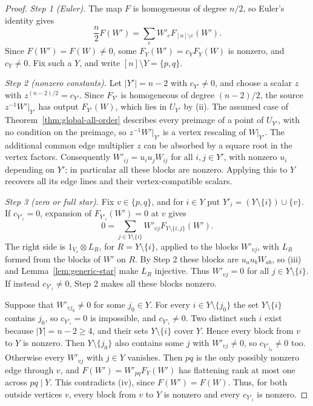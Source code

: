 \documentclass[11pt]{article}
\theoremstyle{remark}\newtheorem{remark}[theorem]{Remark}
\begin{document}
\begin{proof}
\emph{Step 1 (Euler).} The map $F$ is homogeneous of degree $n/2$, so
Euler's identity gives
\[
 \frac n2F(W')=\sum_e W'_eF_{[n]\setminus e}(W').
\]
Since $F(W')=F(W)\ne0$, some $F_Y(W')=c_YF_Y(W)$ is nonzero, and
$c_Y\ne0$. Fix such a $Y$, and write $[n]\setminus Y=\{p,q\}$.

\emph{Step 2 (nonzero constants).} Let $|Y'|=n-2$ with $c_{Y'}\ne0$,
and choose a scalar $z$ with $z^{(n-2)/2}=c_{Y'}$. Since $F_{Y'}$ is
homogeneous of degree $(n-2)/2$, the source $z^{-1}W'|_{Y'}$ has
output $F_{Y'}(W)$, which lies in $U_{Y'}$ by (ii). The assumed case of
Theorem~\ref{thm:global-all-order} describes every preimage of a point
of $U_{Y'}$, with no condition on the preimage, so $z^{-1}W'|_{Y'}$ is
a vertex rescaling of $W|_{Y'}$. The additional common edge multiplier
$z$ can be absorbed by a square root in the vertex factors.
Consequently $W'_{ij}=u_iu_jW_{ij}$ for all $i,j\in Y'$, with nonzero
$u_i$ depending on $Y'$; in particular all these blocks are nonzero.
Applying this to $Y$ recovers all its edge lines and their
vertex-compatible scalars.

\emph{Step 3 (zero or full star).} Fix $v\in\{p,q\}$, and for $i\in Y$
put $Y'_i=(Y\setminus\{i\})\cup\{v\}$. If $c_{Y'_i}=0$, expansion of
$F_{Y'_i}(W')=0$ at $v$ gives
\[
 0=\sum_{j\in Y\setminus\{i\}}
 W'_{vj}F_{Y\setminus\{i,j\}}(W').
\]
The right side is $1_{V_v}\otimes L_R$, for $R=Y\setminus\{i\}$,
applied to the blocks $W'_{vj}$, with $L_R$ formed from the blocks of
$W'$ on $R$. By Step 2 these blocks are $u_au_bW_{ab}$, so (iii) and
Lemma~\ref{lem:generic-star} make $L_R$ injective. Thus $W'_{vj}=0$
for all $j\in Y\setminus\{i\}$. If instead $c_{Y'_i}\ne0$, Step 2
makes all these blocks nonzero.

Suppose that $W'_{vj_0}\ne0$ for some $j_0\in Y$. For every
$i\in Y\setminus\{j_0\}$ the set $Y\setminus\{i\}$ contains $j_0$, so
$c_{Y'_i}=0$ is impossible, and $c_{Y'_i}\ne0$. Two distinct such $i$
exist because $|Y|=n-2\geq4$, and their sets $Y\setminus\{i\}$ cover
$Y$. Hence every block from $v$ to $Y$ is nonzero. Then
$Y\setminus\{j_0\}$ also contains some $j$ with $W'_{vj}\ne0$, so
$c_{Y'_{j_0}}\ne0$ too. Otherwise every $W'_{vj}$ with $j\in Y$
vanishes. Then $pq$ is the only possibly nonzero edge through $v$, and
$F(W')=W'_{pq}F_Y(W')$ has flattening rank at most one across
$pq\mid Y$. This contradicts (iv), since $F(W')=F(W)$. Thus, for both
outside vertices $v$, every block from $v$ to $Y$ is nonzero and every
$c_{Y'_i}$ is nonzero.


\end{proof}
\end{document}
